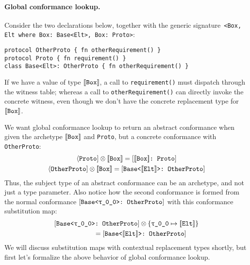 \documentclass[../generics]{subfiles}
\begin{document}
\paragraph{Global conformance lookup.} Consider the two declarations below, together with the generic signature~\verb|<Box, Elt where Box: Base<Elt>, Box: Proto>|:
\begin{Verbatim}
protocol OtherProto { fn otherRequirement() }
protocol Proto { fn requirement() }
class Base<Elt>: OtherProto { fn otherRequirement() }
\end{Verbatim}
If we have a value of type $[\![\texttt{Box}]\!]$, a call to \texttt{requirement()} must dispatch through the witness table; whereas a call to \texttt{otherRequirement()} can directly invoke the concrete witness, even though we don't have the concrete replacement type for $[\![\texttt{Box}]\!]$.

We want global conformance lookup to return an abstract conformance when given the archetype $[\![\texttt{Box}]\!]$ and \texttt{Proto}, but a concrete conformance with \texttt{OtherProto}:
\begin{gather*}
\Proto{Proto}\otimes \archetype{Box} = \ConfReq{$\archetype{Box}$}{Proto}\\
\Proto{OtherProto}\otimes \archetype{Box} = \ConfReq{Base<$\archetype{Elt}$>}{OtherProto}
\end{gather*}
Thus, the subject type of an abstract conformance can be an archetype, and not just a type parameter. Also notice how the second conformance is formed from the normal conformance $\ConfReq{Base<\rT>}{OtherProto}$ with this conformance substitution map:
\begin{gather*}
\ConfReq{Base<\rT>}{OtherProto}\otimes\SubstMap{\SubstType{\rT}{$\archetype{Elt}$}}\\
\qquad\qquad {} = \ConfReq{Base<$\archetype{Elt}$>}{OtherProto}
\end{gather*}
We will discuss substitution maps with contextual replacement types shortly, but first let's formalize the above behavior of global conformance lookup.
\end{document}
